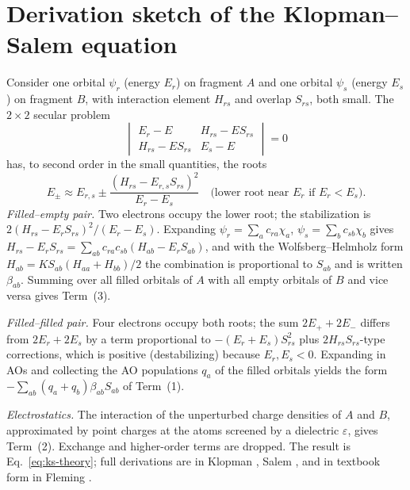\documentclass[11pt,a4paper]{article}
\begin{document}
\section{Derivation sketch of the Klopman--Salem equation}
\label{app:ks}
Consider one orbital $\psi_r$ (energy $E_r$) on fragment $A$ and one orbital $\psi_s$ (energy $E_s$) on fragment $B$, with interaction element $H_{rs}$ and overlap $S_{rs}$, both small. The $2\times2$ secular problem
\[
\begin{vmatrix} E_r-E & H_{rs}-ES_{rs}\\ H_{rs}-ES_{rs} & E_s-E\end{vmatrix}=0
\]
has, to second order in the small quantities, the roots
\begin{equation}
E_\pm\approx E_{r,s}\pm\frac{(H_{rs}-E_{r,s}S_{rs})^2}{E_r-E_s}\quad\text{(lower root near }E_r\text{ if }E_r<E_s).
\end{equation}
\emph{Filled--empty pair.} Two electrons occupy the lower root; the stabilization is $2(H_{rs}-E_rS_{rs})^2/(E_r-E_s)$. Expanding $\psi_r=\sum_a c_{ra}\chi_a$, $\psi_s=\sum_b c_{sb}\chi_b$ gives $H_{rs}-E_rS_{rs}=\sum_{ab}c_{ra}c_{sb}(H_{ab}-E_rS_{ab})$, and with the Wolfsberg--Helmholz form $H_{ab}=K S_{ab}(H_{aa}+H_{bb})/2$ the combination is proportional to $S_{ab}$ and is written $\beta_{ab}$. Summing over all filled orbitals of $A$ with all empty orbitals of $B$ and vice versa gives Term~(3).

\emph{Filled--filled pair.} Four electrons occupy both roots; the sum $2E_++2E_-$ differs from $2E_r+2E_s$ by a term proportional to $-(E_r+E_s)S_{rs}^2$ plus $2H_{rs}S_{rs}$-type corrections, which is positive (destabilizing) because $E_r,E_s<0$. Expanding in AOs and collecting the AO populations $q_a$ of the filled orbitals yields the form $-\sum_{ab}(q_a+q_b)\beta_{ab}S_{ab}$ of Term~(1).

\emph{Electrostatics.} The interaction of the unperturbed charge densities of $A$ and $B$, approximated by point charges at the atoms screened by a dielectric $\varepsilon$, gives Term~(2). Exchange and higher-order terms are dropped. The result is Eq.~\eqref{eq:ks-theory}; full derivations are in Klopman \cite{klopman}, Salem \cite{salem}, and in textbook form in Fleming \cite{fleming}.
\end{document}
